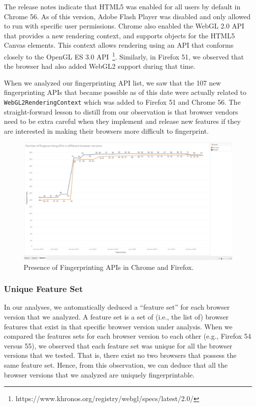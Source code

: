 The release notes indicate that HTML5 was enabled for all users by
default in Chrome 56. As of this version, Adobe Flash Player was
disabled and only allowed to run with specific user permissions.
Chrome also enabled the WebGL 2.0 API that provides a new rendering
context, and supports objects for the HTML5 Canvas elements. This
context allows rendering using an API that conforms closely to the
OpenGL ES 3.0
API~\footnote{https://www.khronos.org/registry/webgl/specs/latest/2.0/}.
Similarly, in Firefox 51, we observed that the browser had also added
WebGL2 support during that time.

When we analyzed our fingerprinting API list, we saw that the 107 new
fingerprinting APIs that became possible as of this date were actually
related to \texttt{WebGL2RenderingContext} which was added to Firefox
51 and Chrome 56. The straight-forward lesson to distill from our
observation is that browser vendors need to be extra careful when they
implement and release new features if they are interested in making
their browsers more difficult to fingerprint.

\begin{figure}[ht]
    \centering
    \includegraphics[width=\textwidth]{figures/Fingerprinting-APIs.png}
    \caption{Presence of Fingerprinting APIs in Chrome and Firefox.}
    \label{fig:fingerprint-apis}
\end{figure}

\subsubsection{Unique Feature Set}

In our analyses, we automatically deduced a ``feature set'' for each
browser version that we analyzed. A feature set is a set of (i.e., the
list of) browser features that exist in that specific browser version
under analysis. When we compared the features sets for each browser
version to each other (e.g., Firefox 54 versus 55), we observed that
each feature set was unique for all the browser versions that we
tested. That is, there exist no two browsers that possess the same
feature set. Hence, from this observation, we can deduce that all the
browser versions that we analyzed are uniquely fingerprintable.

